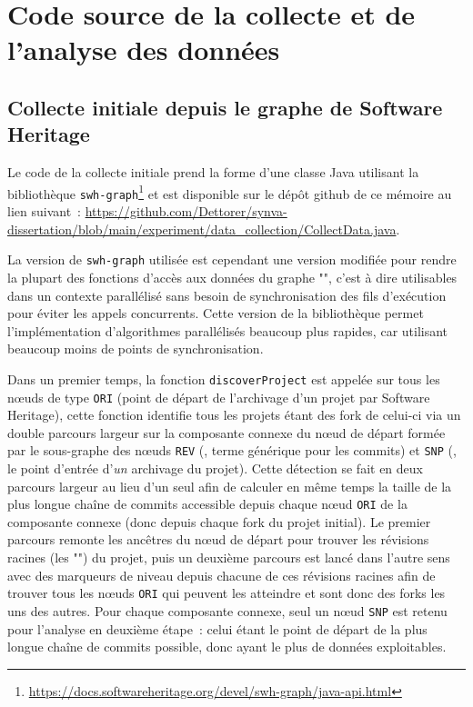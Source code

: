 
\chapter{Code source de la collecte et de l'analyse des données}

\section{Collecte initiale depuis le graphe de Software Heritage}
\label{app:collect.java}


Le code de la collecte initiale prend la forme d'une classe Java utilisant la bibliothèque
\texttt{swh-graph}\footnote{\url{https://docs.softwareheritage.org/devel/swh-graph/java-api.html}} et est
disponible sur le dépôt \gls{github} de ce mémoire au lien suivant :
\url{https://github.com/Dettorer/synva-dissertation/blob/main/experiment/data_collection/CollectData.java}.

La version de \texttt{swh-graph} utilisée est cependant une version modifiée pour rendre la plupart des
fonctions d'accès aux données du graphe "", c'est à dire utilisables dans un contexte
parallélisé sans besoin de synchronisation des fils d'exécution pour éviter les appels concurrents. Cette
version de la bibliothèque permet l'implémentation d'algorithmes parallélisés beaucoup plus rapides, car
utilisant beaucoup moins de points de synchronisation.

Dans un premier temps, la fonction \texttt{discoverProject} est appelée sur tous les nœuds de type
\texttt{ORI} (point de départ de l'archivage d'un projet par Software Heritage), cette fonction identifie tous
les projets étant des \gls{fork} de celui-ci via un double parcours largeur sur la composante connexe du nœud
de départ formée par le sous-graphe des nœuds \texttt{REV} (, terme générique pour les
\glspl{commit}) et \texttt{SNP} (, le point d'entrée d'\emph{un} archivage du projet). Cette
détection se fait en deux parcours largeur au lieu d'un seul afin de calculer en même temps la taille de la
plus longue chaîne de commits accessible depuis chaque nœud \texttt{ORI} de la composante connexe (donc depuis
chaque \gls{fork} du projet initial). Le premier parcours remonte les ancêtres du nœud de départ pour trouver
les révisions racines (les "") du projet, puis un deuxième parcours est lancé dans
l'autre sens avec des marqueurs de niveau depuis chacune de ces révisions racines afin de trouver tous les
nœuds \texttt{ORI} qui peuvent les atteindre et sont donc des \glspl{fork} les uns des autres. Pour chaque
composante connexe, seul un nœud \texttt{SNP} est retenu pour l'analyse en deuxième étape : celui étant le
point de départ de la plus longue chaîne de \glspl{commit} possible, donc ayant le plus de données
exploitables.

